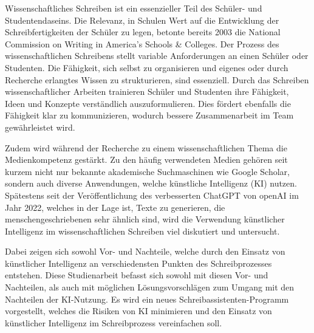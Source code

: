 \documentclass[../main.tex]{subfiles}
\begin{document}
Wissenschaftliches Schreiben ist ein essenzieller Teil des Schüler- und Studentendaseins. 
Die Relevanz, in Schulen Wert auf die Entwicklung der Schreibfertigkeiten der Schüler zu legen, betonte bereits 2003 
die National Commission on Writing in America’s Schools \& Colleges.  Der Prozess des 
wissenschaftlichen Schreibens stellt variable Anforderungen an einen Schüler oder Studenten. Die Fähigkeit, sich selbst zu organisieren und 
eigenes oder durch Recherche erlangtes Wissen zu strukturieren, sind essenziell. Durch das Schreiben 
wissenschaftlicher Arbeiten trainieren Schüler und Studenten ihre Fähigkeit, Ideen und Konzepte verständlich 
auszuformulieren. Dies fördert ebenfalls die Fähigkeit klar zu kommunizieren, wodurch bessere Zusammenarbeit 
im Team gewährleistet wird.  

Zudem wird während der Recherche zu einem wissenschaftlichen Thema die Medienkompetenz gestärkt. Zu den häufig 
verwendeten Medien gehören seit kurzem nicht nur bekannte akademische Suchmaschinen wie Google Scholar, sondern auch 
diverse Anwendungen, welche künstliche Intelligenz (KI) nutzen. Spätestens seit der Veröffentlichung des verbesserten ChatGPT von openAI im Jahr 2022, welches in der 
Lage ist, Texte zu generieren, die menschengeschriebenen sehr ähnlich sind, wird die Verwendung künstlicher Intelligenz 
im wissenschaftlichen Schreiben viel diskutiert und untersucht.\cite{humanWritingToAi}

Dabei zeigen sich sowohl Vor- und Nachteile, welche durch den Einsatz von künstlicher Intelligenz an verschiedensten Punkten des Schreibprozesses entstehen. 
Diese Studienarbeit befasst sich sowohl mit diesen Vor- und Nachteilen, als auch mit möglichen
Lösungsvorschlägen zum Umgang mit den Nachteilen der KI-Nutzung. Es wird ein neues Schreibassistenten-Programm vorgestellt, welches die Risiken 
von KI minimieren und den Einsatz von künstlicher Intelligenz im Schreibprozess vereinfachen soll.
\end{document}
